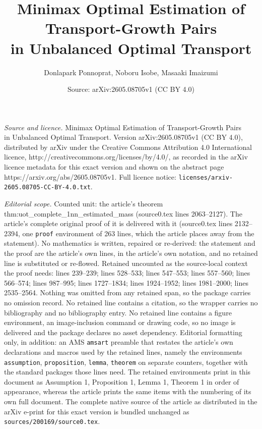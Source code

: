 \documentclass[10pt,a4paper]{amsart}
\title{{\Large Minimax Optimal Estimation of Transport-Growth Pairs \\ in Unbalanced Optimal Transport}}
\author{Donlapark Ponnoprat, Noboru Isobe, Masaaki Imaizumi}
\date{Source: arXiv:2605.08705v1 (CC BY 4.0)}
\begin{document}
\maketitle

\noindent\emph{Source and licence.} {\Large Minimax Optimal Estimation of Transport-Growth Pairs \\ in Unbalanced Optimal Transport}. Version arXiv:2605.08705v1 (CC BY 4.0), distributed by arXiv under the Creative Commons Attribution 4.0 International licence, http://creativecommons.org/licenses/by/4.0/, as recorded in the arXiv licence metadata for this exact version and shown on the abstract page https://arxiv.org/abs/2605.08705v1. Full licence notice: \texttt{licenses/arxiv-2605.08705-CC-BY-4.0.txt}.\par\smallskip

\noindent\textit{Editorial scope.} Counted unit: the article's theorem thm:uot\_complete\_1nn\_estimated\_mass (source0.tex lines 2063--2127). The article's complete original proof of it is delivered with it (source0.tex lines 2132--2394, one \texttt{proof} environment of 263 lines, which the article places away from the statement). No mathematics is written, repaired or re-derived: the statement and the proof are the article's own lines, in the article's own notation, and no retained line is substituted or re-flowed.  Retained uncounted as the source-local context the proof needs: lines 239--239; lines 528--533; lines 547--553; lines 557--560; lines 566--574; lines 987--995; lines 1727--1834; lines 1924--1952; lines 1981--2000; lines 2535--2564.  Nothing was omitted from any retained span, so the package carries no omission record.  No retained line contains a citation, so the wrapper carries no bibliography and no bibliography entry.  No retained line contains a figure environment, an image-inclusion command or drawing code, so no image is delivered and the package declares no asset dependency.  Editorial formatting only, in addition: an AMS \texttt{amsart} preamble that restates the article's own declarations and macros used by the retained lines, namely the environments \texttt{assumption}, \texttt{proposition}, \texttt{lemma}, \texttt{theorem} on separate counters, together with the standard packages those lines need.  The retained environments print in this document as Assumption 1, Proposition 1, Lemma 1, Theorem 1 in order of appearance, whereas the article prints the same items with the numbering of its own full document.  The complete native source of the article as distributed in the arXiv e-print for this exact version is bundled unchanged as \texttt{sources/200169/source0.tex}.
\end{document}
